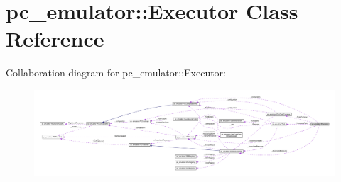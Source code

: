 \hypertarget{classpc__emulator_1_1Executor}{}\section{pc\+\_\+emulator\+:\+:Executor Class Reference}
\label{classpc__emulator_1_1Executor}


Collaboration diagram for pc\+\_\+emulator\+:\+:Executor\+:\nopagebreak
\begin{figure}[H]
\begin{center}
\leavevmode
\includegraphics[width=350pt]{classpc__emulator_1_1Executor__coll__graph}
\end{center}
\end{figure}
